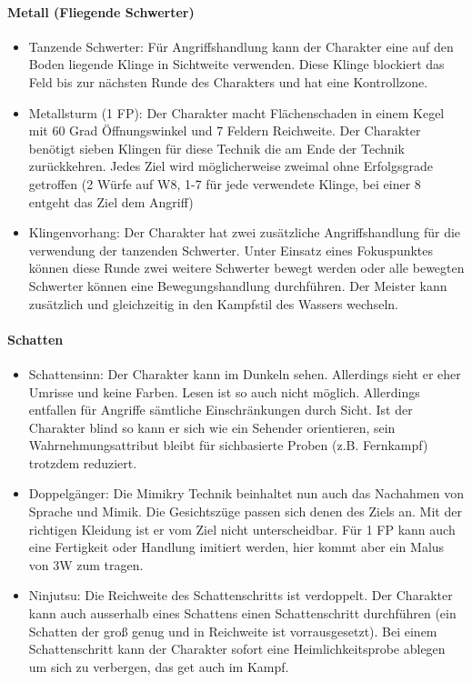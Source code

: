 \documentclass{article}
\begin{document}
\paragraph{Metall (Fliegende Schwerter)}

\begin{itemize}
\item Tanzende Schwerter: Für Angriffshandlung kann der Charakter eine auf den Boden liegende Klinge in Sichtweite verwenden. Diese Klinge blockiert das Feld bis zur nächsten Runde des Charakters und hat eine Kontrollzone.
\item Metallsturm (1 FP): Der Charakter macht Flächenschaden in einem Kegel mit 60 Grad Öffnungswinkel und 7 Feldern Reichweite. Der Charakter benötigt sieben Klingen für diese Technik die am Ende der Technik zurückkehren. Jedes Ziel wird möglicherweise zweimal ohne Erfolgsgrade getroffen (2 Würfe auf W8, 1-7 für jede verwendete Klinge, bei einer 8 entgeht das Ziel dem Angriff)
\item Klingenvorhang: Der Charakter hat zwei zusätzliche Angriffshandlung für die verwendung der tanzenden Schwerter. Unter Einsatz eines Fokuspunktes können diese Runde zwei weitere Schwerter bewegt werden oder alle bewegten Schwerter können eine Bewegungshandlung durchführen. Der Meister kann zusätzlich und gleichzeitig in den Kampfstil des Wassers wechseln.
\end{itemize}

\paragraph{Schatten}

\begin{itemize}
\item Schattensinn: Der Charakter kann im Dunkeln sehen. Allerdings sieht er eher Umrisse und keine Farben. Lesen ist so auch nicht möglich. Allerdings entfallen für Angriffe sämtliche Einschränkungen durch Sicht. Ist der Charakter blind so kann er sich wie ein Sehender orientieren, sein Wahrnehmungsattribut bleibt für sichbasierte Proben (z.B. Fernkampf) trotzdem reduziert.
\item Doppelgänger: Die Mimikry Technik beinhaltet nun auch das Nachahmen von Sprache und Mimik. Die Gesichtszüge passen sich denen des Ziels an. Mit der richtigen Kleidung ist er vom Ziel nicht unterscheidbar. Für 1 FP kann auch eine Fertigkeit oder Handlung imitiert werden, hier kommt aber ein Malus von 3W zum tragen.
\item Ninjutsu: Die Reichweite des Schattenschritts ist verdoppelt. Der Charakter kann auch ausserhalb eines Schattens einen Schattenschritt durchführen (ein Schatten der groß genug und in Reichweite ist vorrausgesetzt). Bei einem Schattenschritt kann der Charakter sofort eine Heimlichkeitsprobe ablegen um sich zu verbergen, das get auch im Kampf.
\end{itemize}
\end{document}
